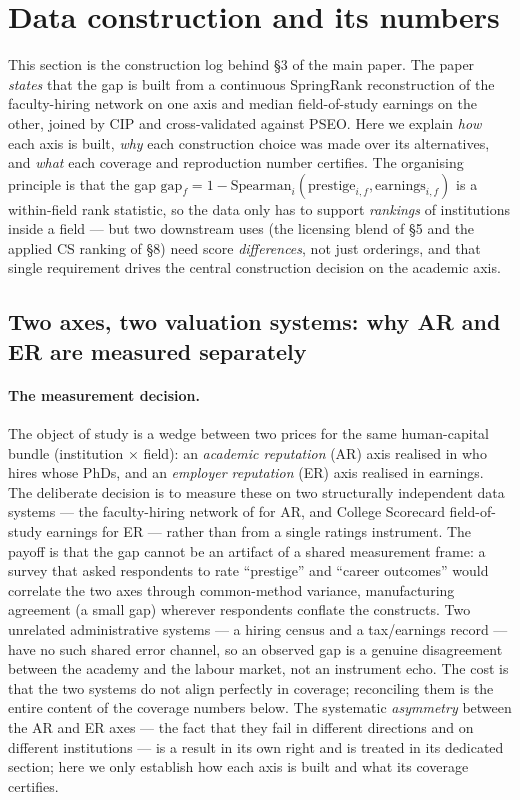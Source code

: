 \documentclass[11pt]{article}
\begin{document}
\section{Data construction and its numbers}
\label{sec:companion-data}

This section is the construction log behind \S3 of the main paper. The paper \emph{states} that the gap is built from a continuous SpringRank reconstruction of the faculty-hiring network on one axis and median field-of-study earnings on the other, joined by CIP and cross-validated against PSEO. Here we explain \emph{how} each axis is built, \emph{why} each construction choice was made over its alternatives, and \emph{what} each coverage and reproduction number certifies. The organising principle is that the gap $\mathrm{gap}_f = 1 - \mathrm{Spearman}_i(\text{prestige}_{i,f}, \text{earnings}_{i,f})$ is a within-field rank statistic, so the data only has to support \emph{rankings} of institutions inside a field --- but two downstream uses (the licensing blend of \S5 and the applied CS ranking of \S8) need score \emph{differences}, not just orderings, and that single requirement drives the central construction decision on the academic axis.

\subsection{Two axes, two valuation systems: why AR and ER are measured separately}

\paragraph{The measurement decision.} The object of study is a wedge between two prices for the same human-capital bundle (institution $\times$ field): an \emph{academic reputation} (AR) axis realised in who hires whose PhDs, and an \emph{employer reputation} (ER) axis realised in earnings. The deliberate decision is to measure these on two structurally independent data systems --- the faculty-hiring network of \citet{wapman2022quantifying} for AR, and College Scorecard field-of-study earnings \citep{scorecard} for ER --- rather than from a single ratings instrument. The payoff is that the gap cannot be an artifact of a shared measurement frame: a survey that asked respondents to rate ``prestige'' and ``career outcomes'' would correlate the two axes through common-method variance, manufacturing agreement (a small gap) wherever respondents conflate the constructs. Two unrelated administrative systems --- a hiring census and a tax/earnings record --- have no such shared error channel, so an observed gap is a genuine disagreement between the academy and the labour market, not an instrument echo. The cost is that the two systems do not align perfectly in coverage; reconciling them is the entire content of the coverage numbers below. The systematic \emph{asymmetry} between the AR and ER axes --- the fact that they fail in different directions and on different institutions --- is a result in its own right and is treated in its dedicated section; here we only establish how each axis is built and what its coverage certifies.
\end{document}
